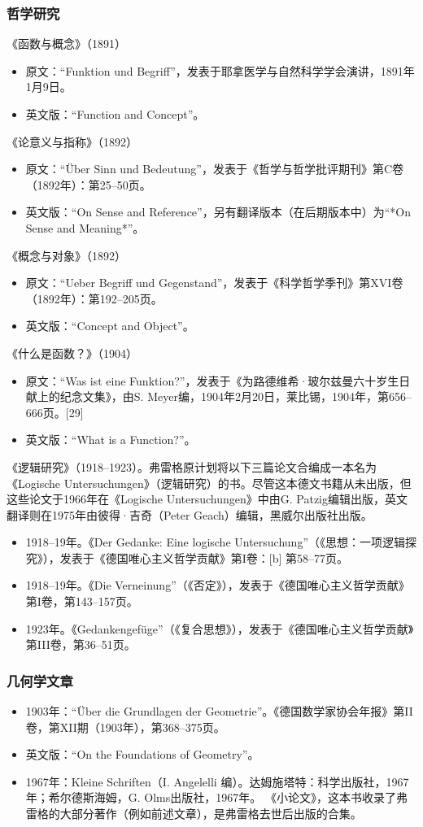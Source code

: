 \subsubsection{哲学研究}  
《函数与概念》（1891）
\begin{itemize}
\item 原文：“Funktion und Begriff”，发表于耶拿医学与自然科学学会演讲，1891年1月9日。  
\item 英文版：“Function and Concept”。
\end{itemize}
《论意义与指称》（1892）
\begin{itemize}
\item 原文：“Über Sinn und Bedeutung”，发表于《哲学与哲学批评期刊》第C卷（1892年）：第25–50页。  
\item 英文版：“On Sense and Reference”，另有翻译版本（在后期版本中）为“*On Sense and Meaning*”。
\end{itemize}
《概念与对象》（1892）
\begin{itemize}
\item 原文：“Ueber Begriff und Gegenstand”，发表于《科学哲学季刊》第XVI卷（1892年）：第192–205页。  
\item 英文版：“Concept and Object”。
\end{itemize}
《什么是函数？》（1904）
\begin{itemize}
\item 原文：“Was ist eine Funktion?”，发表于《为路德维希·玻尔兹曼六十岁生日献上的纪念文集》，由S. Meyer编，1904年2月20日，莱比锡，1904年，第656–666页。[29]  
\item 英文版：“What is a Function?”。
\end{itemize}
《逻辑研究》（1918–1923）。弗雷格原计划将以下三篇论文合编成一本名为《Logische Untersuchungen》（逻辑研究）的书。尽管这本德文书籍从未出版，但这些论文于1966年在《Logische Untersuchungen》中由G. Patzig编辑出版，英文翻译则在1975年由彼得·吉奇（Peter Geach）编辑，黑威尔出版社出版。
\begin{itemize}
\item 1918–19年。《Der Gedanke: Eine logische Untersuchung”（《思想：一项逻辑探究》），发表于《德国唯心主义哲学贡献》第I卷：[b] 第58–77页。  
\item 1918–19年。《Die Verneinung”（《否定》），发表于《德国唯心主义哲学贡献》第I卷，第143–157页。  
\item 1923年。《Gedankengefüge”（《复合思想》），发表于《德国唯心主义哲学贡献》第III卷，第36–51页。
\end{itemize}
\subsubsection{几何学文章}  
\begin{itemize}
\item 1903年：“Über die Grundlagen der Geometrie”。《德国数学家协会年报》第II卷，第XII期（1903年），第368–375页。  
\item 英文版：“On the Foundations of Geometry”。
\item 1967年：Kleine Schriften（I. Angelelli 编）。达姆施塔特：科学出版社，1967年；希尔德斯海姆，G. Olms出版社，1967年。  
《小论文》，这本书收录了弗雷格的大部分著作（例如前述文章），是弗雷格去世后出版的合集。
\end{itemize}
